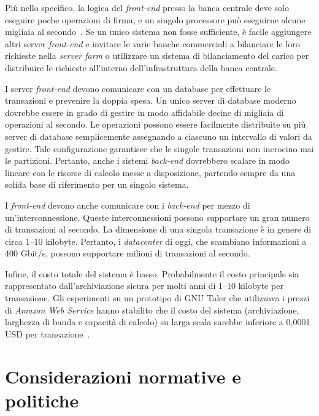 \documentclass{article}
\begin{document}
Più nello specifico, la logica del \textit{front-end} presso la banca
centrale deve solo eseguire poche operazioni di firma, e un singolo
processore può eseguirne alcune migliaia al secondo~\cite[vedi][]{Bernstein2020}.
Se un unico sistema non fosse sufficiente, è facile aggiungere altri
server \textit{front-end} e invitare le varie banche commerciali a
bilanciare le loro richieste nella \textit{server farm} o
utilizzare un sistema di bilanciamento del carico per distribuire le
richieste all'interno dell'infrastruttura della banca centrale.

I server \textit{front-end} devono comunicare con un database per
effettuare le transazioni e prevenire la doppia spesa. Un unico server
di database moderno dovrebbe essere in grado di gestire in modo
affidabile decine di migliaia di operazioni al secondo. Le operazioni
possono essere facilmente distribuite su più server di database
semplicemente assegnando a ciascuno un intervallo di valori da
gestire. Tale configurazione garantisce che le singole transazioni non
incrocino mai le partizioni. Pertanto, anche i sistemi \textit{back-end}
dovrebbero scalare in modo lineare con le risorse di calcolo messe a
disposizione, partendo sempre da una solida base di riferimento per un
singolo sistema.

I \textit{front-end} devono anche comunicare con i \textit{back-end} per
mezzo di un'interconnessione. Queste interconnessioni possono
supportare un gran numero di transazioni al secondo. La dimensione di
una singola transazione è in genere di circa 1–10 kilobyte. Pertanto,
i \textit{datacenter} di oggi, che scambiano informazioni a 400 Gbit/s,
possono supportare milioni di transazioni al secondo.

Infine, il costo totale del sistema è basso. Probabilmente il costo
principale sia rappresentato dall'archiviazione sicura per
molti anni di 1–10 kilobyte per transazione. Gli esperimenti su un
prototipo di GNU Taler che utilizzava i prezzi di \textit{Amazon Web Service}
hanno stabilito che il costo del sistema (archiviazione, larghezza di
banda e capacità di calcolo) su larga scala sarebbe inferiore a
0,0001 USD per transazione~\cite[per i dettagli sui dati, si veda][]{Dold}.

\section{Considerazioni normative e politiche}
    \label{5.-considerazioni-normative-e-politiche}
\end{document}
